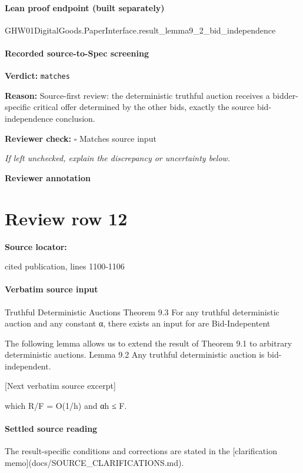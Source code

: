 \documentclass[10pt]{article}
\newcommand{\reviewerbox}{%
  \par\noindent\fbox{\parbox{0.96\linewidth}{\rule{0pt}{0.38in}}}\par
}
\newcommand{\reviewmatch}[1]{%
  \par\noindent\textbf{Reviewer check:} $\square$\; #1\par
  \noindent\emph{If left unchecked, explain the discrepancy or uncertainty below.}\par
}
\begin{document}
\paragraph{Lean proof endpoint (built separately)}\begin{ReviewVerbatim}
GHW01DigitalGoods.PaperInterface.result_lemma9_2_bid_independence
\end{ReviewVerbatim}

\paragraph{Recorded source-to-Spec screening}
\textbf{Verdict:} \texttt{matches}
\\
{\raggedright
\textbf{Reason:} Source-\allowbreak{}first review:\allowbreak{} the deterministic truthful auction receives a bidder-\allowbreak{}specific critical offer determined by the other bids, exactly the source bid-\allowbreak{}independence conclusion.\allowbreak{}
\par}
\reviewmatch{Matches source input}
\noindent\textbf{Reviewer annotation}\par
\reviewerbox
\clearpage
\hypertarget{source-claim-6ef8d3c17f2b5df3}{}
\section*{Review row 12}
\textbf{Source locator:} {\footnotesize\raggedright cited publication, lines 1100-\allowbreak{}1106\par}
\paragraph{Verbatim source input}
\begin{ReviewVerbatim}
Truthful Deterministic Auctions Theorem 9.3 For any truthful deterministic auction and any constant α, there exists an input for
are Bid-Indepentent

The following lemma allows us to extend the result
of Theorem 9.1 to arbitrary deterministic auctions.
Lemma 9.2 Any truthful deterministic auction is
bid-independent.

[Next verbatim source excerpt]

which R/F = O(1/h) and αh ≤ F.
\end{ReviewVerbatim}

\paragraph{Settled source reading}
\begin{sloppypar}
The result-\allowbreak{}specific conditions and corrections are stated in the [clarification memo](docs/\allowbreak{}SOURCE\_\allowbreak{}CLARIFICATIONS.\allowbreak{}md).\allowbreak{}
\end{sloppypar}
\end{document}
